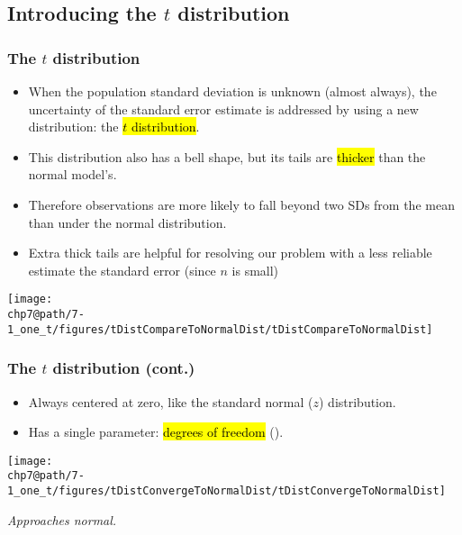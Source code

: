 \documentclass[slidestop,compress,mathserif]{beamer}
\makeatletter
\newcommand{\soln}[1]{\textit{#1}}
\def\chp7@path{../../Chp 7}
\makeatother
\begin{document}

\subsection{Introducing the $t$ distribution}


\begin{frame}
\frametitle{The $t$ distribution}

\begin{itemize}

\item When the population standard deviation is unknown (almost always), the uncertainty of the standard error estimate is addressed by using a new distribution: the \hl{$t$ distribution}.

\pause

\item This distribution also has a bell shape, but its tails are \hl{thicker} than the normal model's.

\pause

\item Therefore observations are more likely to fall beyond two SDs from the mean than under the normal distribution.

\pause

\item Extra thick tails are helpful for resolving our problem with a less reliable estimate the standard error (since $n$ is small)

\end{itemize}

\begin{center}
\texttt{[image: \\chp7@path/7-1\_one\_t/figures/tDistCompareToNormalDist/tDistCompareToNormalDist]}
\end{center}

\end{frame}


\begin{frame}
\frametitle{The $t$ distribution (cont.)}

\begin{itemize}

\item Always centered at zero, like the standard normal ($z$) distribution.

\item Has a single parameter: \hl{degrees of freedom} ().

\end{itemize}

\begin{center}
\texttt{[image: \\chp7@path/7-1\_one\_t/figures/tDistConvergeToNormalDist/tDistConvergeToNormalDist]}
\end{center}

\pause


\soln{\pause Approaches normal.}

\end{frame}
\end{document}
